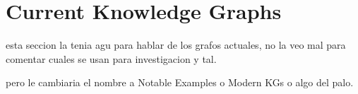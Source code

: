 


\section{Current Knowledge Graphs}\label{sec:kgs-current}
esta seccion la tenia agu para hablar de los grafos actuales, no la veo mal para comentar cuales se usan para investigacion y tal.

pero le cambiaria el nombre a Notable Examples o Modern KGs o algo del palo.

